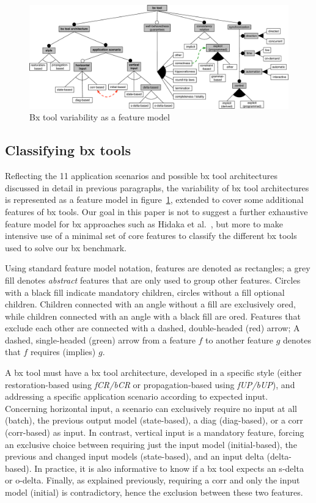 \begin{figure}[tb!]
	\centering
	\includegraphics[width=\textwidth]{diagrams/foundations/feature-model-bx-tool}
	\caption{Bx tool variability as a feature model}
	\label{fig:featureModelBxTools}
\end{figure}

\subsection{Classifying bx tools}
\label{sec:classifying-bx-tools}
Reflecting the 11 application scenarios and possible bx tool architectures discussed in detail in previous paragraphs, the variability of bx tool architectures is represented as a feature model in figure~\ref{fig:featureModelBxTools}, extended to cover some additional features of bx tools.
Our goal in this paper is not to suggest a further exhaustive feature model for bx approaches such as Hidaka et al.~\cite{SOSYM-Hidaka2016}, but more to make intensive use of a minimal set of core features to classify the different bx tools used to solve our bx benchmark.

Using standard feature model notation, features are denoted as rectangles; a grey fill denotes \emph{abstract} features that are only used to group other features.
Circles with a black fill indicate mandatory children, circles without a fill optional children.
Children connected with an angle without a fill are exclusively ored, while children connected with an angle with a black fill are ored.
Features that exclude each other are connected with a dashed, double-headed (red) arrow; 
A dashed, single-headed (green) arrow from a feature $f$ to another feature $g$ denotes that $f$ requires (implies) $g$.   


A bx tool must have a bx tool architecture, developed in a specific style (either restoration-based using \emph{fCR/bCR} or propagation-based using \emph{fUP/bUP}), and addressing a specific application scenario according to expected input. 
%
Concerning horizontal input, a scenario can exclusively require no input at all (batch), the previous output model (state-based), a diag (diag-based), or a corr (corr-based) as input.
%
In contrast, vertical input is a mandatory feature, forcing an exclusive choice between requiring just the input model (initial-based), the previous and changed input models (state-based), and an input delta  (delta-based).
In practice, it is also informative to know if a bx tool expects an s-delta or o-delta.
Finally, as explained previously, requiring a corr and only the input model (initial) is contradictory, hence the exclusion between these two features.

